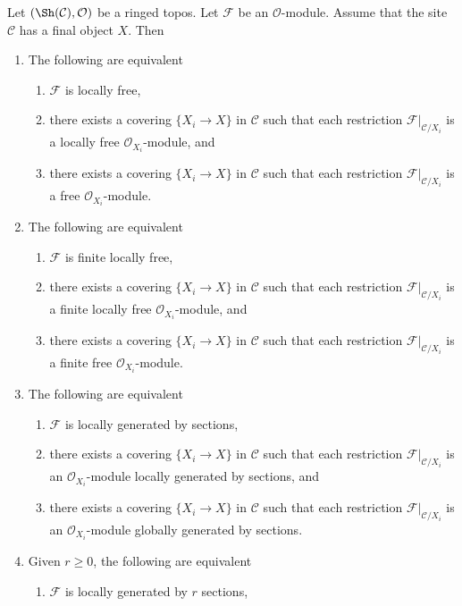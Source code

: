 \begin{lemma}
\label{lemma-local-final-object}
Let $(\Sh(\mathcal{C}), \mathcal{O})$
be a ringed topos. Let $\mathcal{F}$ be an $\mathcal{O}$-module.
Assume that the site $\mathcal{C}$ has a final object $X$.
Then
\begin{enumerate}
\item The following are equivalent
\begin{enumerate}
\item $\mathcal{F}$ is locally free,
\item there exists a covering $\{X_i \to X\}$ in $\mathcal{C}$ such that
each restriction $\mathcal{F}|_{\mathcal{C}/X_i}$ is a locally free
$\mathcal{O}_{X_i}$-module, and
\item there exists a covering $\{X_i \to X\}$ in $\mathcal{C}$ such that
each restriction $\mathcal{F}|_{\mathcal{C}/X_i}$ is a free
$\mathcal{O}_{X_i}$-module.
\end{enumerate}
\item The following are equivalent
\begin{enumerate}
\item $\mathcal{F}$ is finite locally free,
\item there exists a covering $\{X_i \to X\}$ in $\mathcal{C}$
such that each restriction $\mathcal{F}|_{\mathcal{C}/X_i}$
is a finite locally free $\mathcal{O}_{X_i}$-module, and
\item there exists a covering $\{X_i \to X\}$ in $\mathcal{C}$
such that each restriction $\mathcal{F}|_{\mathcal{C}/X_i}$
is a finite free $\mathcal{O}_{X_i}$-module.
\end{enumerate}
\item The following are equivalent
\begin{enumerate}
\item $\mathcal{F}$ is locally generated by sections,
\item there exists a covering $\{X_i \to X\}$ in $\mathcal{C}$
such that each restriction $\mathcal{F}|_{\mathcal{C}/X_i}$
is an $\mathcal{O}_{X_i}$-module locally generated by sections, and
\item there exists a covering $\{X_i \to X\}$ in $\mathcal{C}$
such that each restriction $\mathcal{F}|_{\mathcal{C}/X_i}$
is an $\mathcal{O}_{X_i}$-module globally generated by sections.
\end{enumerate}
\item Given $r \geq 0$, the following are equivalent
\begin{enumerate}
\item $\mathcal{F}$ is locally generated by $r$ sections,

\end{enumerate}
\end{enumerate}
\end{lemma}
